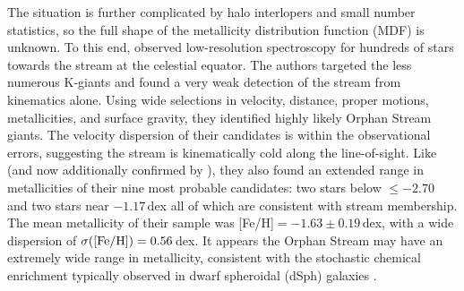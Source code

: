 \documentclass{emulateapj}
\begin{document}
The situation is further complicated by halo interlopers and small number statistics, so the full shape of the metallicity distribution function (MDF) is unknown. To this end, \citet{casey;et-al_2013a} observed low-resolution spectroscopy for hundreds of stars towards the stream at the celestial equator. The authors targeted the less numerous K-giants \citep[a mere 1.3 red giant branch stars expected per square degree]{sales;et-al_2008,morrison_1993} and found a very weak detection of the stream from kinematics alone. Using wide selections in velocity, distance, proper motions, metallicities, and surface gravity, they identified highly likely Orphan Stream giants. The velocity dispersion of their candidates is within the observational errors, suggesting the stream is kinematically cold along the line-of-sight. Like \citet{newberg;et-al_2010} (and now additionally confirmed by \citet{sesar;et-al_2013}), they also found an extended range in metallicities of their nine most probable candidates: two stars below $\leq-2.70$ and two stars near $-1.17$\,dex all of which are consistent with stream membership. The mean metallicity of their sample was [Fe/H]$ = -1.63 \pm 0.19$\,dex, with a wide dispersion of $\sigma({\rm [Fe/H]}) = 0.56$\,dex. It appears the Orphan Stream may have an extremely wide range in metallicity, consistent with the stochastic chemical enrichment typically observed in dwarf spheroidal (dSph) galaxies \citep{mateo_1998}.

\end{document}
